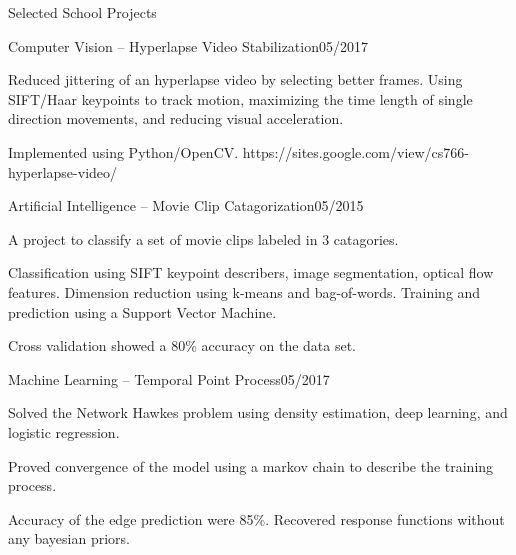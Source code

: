\documentclass{resume} %
\begin{document}
\begin{rSection}{Selected School Projects}

\begin{rSubsection}{Computer Vision -- Hyperlapse Video Stabilization}{05/2017}{}{}
\item Reduced jittering of an hyperlapse video by selecting better frames. Using SIFT/Haar keypoints to track motion, maximizing the time length of single direction movements, and reducing visual acceleration.
\item Implemented using Python/OpenCV. https://sites.google.com/view/cs766-hyperlapse-video/
\end{rSubsection}

\begin{rSubsection}{Artificial Intelligence -- Movie Clip Catagorization}{05/2015}{}{}
\item A project to classify a set of movie clips labeled in 3 catagories. 
\item Classification using SIFT keypoint describers, image segmentation, optical flow features. Dimension reduction using k-means and bag-of-words. Training and prediction using a Support Vector Machine.
\item Cross validation showed a 80\% accuracy on the data set.

\begin{rSubsection}{Machine Learning -- Temporal Point Process}{05/2017}{}{}
\item Solved the Network Hawkes problem using density estimation, deep learning, and logistic regression.
\item Proved convergence of the model using a markov chain to describe the training process.
\item Accuracy of the edge prediction were 85\%. Recovered response functions without any bayesian priors.
\end{rSubsection}




\end{rSubsection}
\end{rSection}
\end{document}
